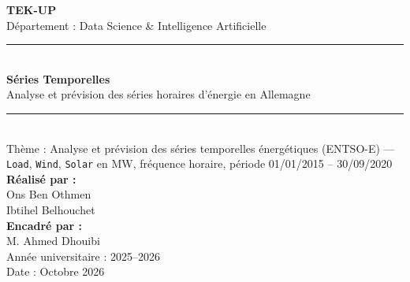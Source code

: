﻿\begin{titlepage}
\begin{center}

{\Large \bfseries TEK-UP}\\[0.4cm]
{\large Département : Data Science \& Intelligence Artificielle}\\[1.5cm]

\rule{\linewidth}{0.5mm}\\[0.6cm]
{\Huge \bfseries Séries Temporelles}\\[0.3cm]
{\Large Analyse et prévision des séries horaires d'énergie en Allemagne}\\[0.4cm]
\rule{\linewidth}{0.5mm}\\[1.2cm]

{\large Thème : Analyse et prévision des séries temporelles énergétiques
(ENTSO-E) --- \texttt{Load}, \texttt{Wind}, \texttt{Solar} en MW, fréquence
horaire, période 01/01/2015 -- 30/09/2020}\\[1.5cm]

{\bfseries Réalisé par :}\\[0.3cm]
Ons Ben Othmen\\[0.2cm]
Ibtihel Belhouchet\\[1.5cm]

{\bfseries Encadré par :}\\[0.3cm]
M. Ahmed Dhouibi\\[1.5cm]

{\large Année universitaire : 2025--2026}\\[0.5cm]
{\large Date : Octobre 2026}

\end{center}
\end{titlepage}

